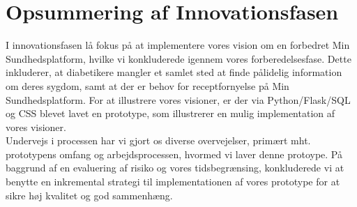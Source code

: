 \section{Opsummering af Innovationsfasen}
I innovationsfasen lå fokus på at implementere vores vision om en forbedret Min Sundhedsplatform, hvilke vi konkluderede igennem vores forberedelsesfase. Dette inkluderer, at diabetikere mangler et samlet sted at finde pålidelig information om deres sygdom, samt at der er behov for receptfornyelse på Min Sundhedsplatform. For at illustrere vores visioner, er der via Python/Flask/SQL og CSS blevet lavet en prototype, som illustrerer en mulig implementation af vores visioner.\\
Undervejs i processen har vi gjort os diverse overvejelser, primært mht. prototypens omfang og arbejdsprocessen, hvormed vi laver denne protoype. På baggrund af en evaluering af risiko og vores tidsbegrænsing, konkluderede vi at benytte en inkremental strategi til implementationen af vores prototype for at sikre høj kvalitet og god sammenhæng. 
